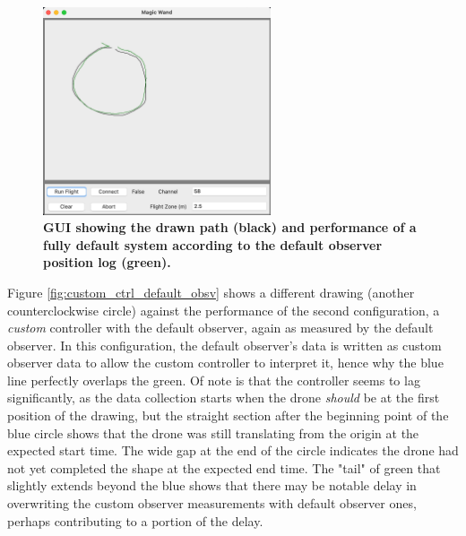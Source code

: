 \documentclass[conf]{new-aiaa}
\begin{document}
        \begin{figure}[H]
        \centering
        \includegraphics[width=0.6\textwidth]{docs/reports/Final Project Update/images/default_both.png}
        \captionsetup{width=0.6\textwidth}
        \caption{\textbf{GUI showing the drawn path (black) and performance of a fully default system according to the default observer position log (green).}}
        \label{fig:default_both}
        \end{figure}
        
        Figure \ref{fig:custom_ctrl_default_obsv} shows a different drawing (another counterclockwise circle) against the performance of the second configuration, a \textit{custom} controller with the default observer, again as measured by the default observer. In this configuration, the default observer's data is written as custom observer data to allow the custom controller to interpret it, hence why the blue line perfectly overlaps the green. Of note is that the controller seems to lag significantly, as the data collection starts when the drone \textit{should} be at the first position of the drawing, but the straight section after the beginning point of the blue circle shows that the drone was still translating from the origin at the expected start time. The wide gap at the end of the circle indicates the drone had not yet completed the shape at the expected end time. The "tail" of green that slightly extends beyond the blue shows that there may be notable delay in overwriting the custom observer measurements with default observer ones, perhaps contributing to a portion of the delay.
        
\end{document}
